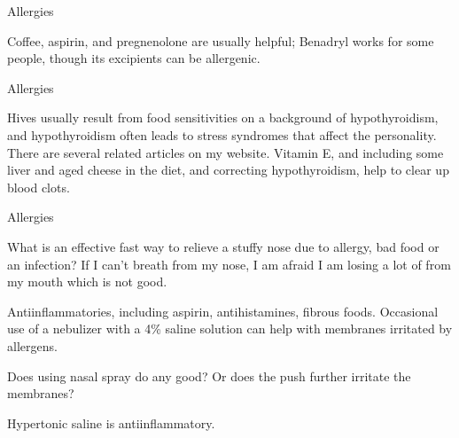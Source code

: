 \documentclass[11pt,oneside,openany,extrafontsizes]{memoir}
\begin{document}
\begin{standalonequote}{Allergies}

    \begin{answer}
      Coffee, aspirin, and pregnenolone are usually helpful; Benadryl works for some people, though its excipients can be allergenic.
    \end{answer}
\end{standalonequote}

\begin{standalonequote}{Allergies}

    \begin{answer}
      Hives usually result from food sensitivities on a background of hypothyroidism, and hypothyroidism often leads to stress syndromes that affect the personality. There are several related articles on my website. Vitamin E, and including some liver and aged cheese in the diet, and correcting hypothyroidism, help to clear up blood clots. 
    \end{answer}
\end{standalonequote}

\begin{emailexchange}{Allergies}

    \begin{question}
        What is an effective fast way to relieve a stuffy nose due to allergy, bad food or an infection? If I can't breath from my nose, I am afraid I am losing a lot of  from my mouth which is not good.
    \end{question}

    \begin{answer}
      Antiinflammatories, including aspirin, antihistamines, fibrous foods. Occasional use of a nebulizer with a 4\% saline solution can help with membranes irritated by allergens.
    \end{answer}

    \begin{question}
        Does using nasal spray do any good? Or does the push further irritate the membranes?
    \end{question}

    \begin{answer}
      Hypertonic saline is antiinflammatory.
    \end{answer}
\end{emailexchange}
\end{document}
